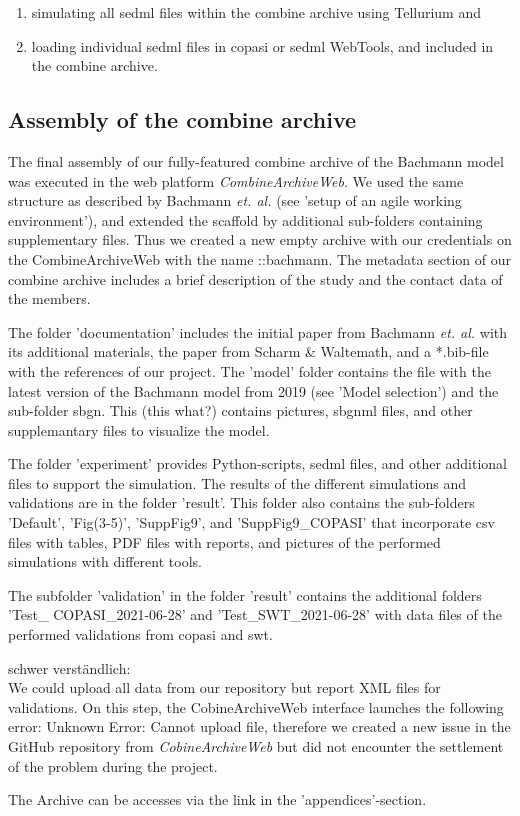 \begin{enumerate}
    \item simulating all \ac{sedml} files within the \ac{combine} archive using Tellurium and
    \item loading individual \ac{sedml} files in \ac{copasi} or \ac{sedml} WebTools, and included in the \ac{combine} archive.
\end{enumerate}

\subsection*{Assembly of the \acs{combine} archive}

The final assembly of our fully-featured \ac{combine} archive of the Bachmann model was executed in the web platform \textit{CombineArchiveWeb}. We used the same structure as described by Bachmann \textit{et. al.} (see 'setup of an agile working environment'), and extended the scaffold by additional sub-folders containing supplementary files. Thus we created a new empty archive with our credentials on the CombineArchiveWeb with the name \textsf{::bachmann}. The metadata section of our \ac{combine} archive includes a brief description of the study and the contact data of the members.

The folder 'documentation' includes the initial paper from Bachmann \textit{et. al.}  with its additional materials, the paper from Scharm \& Waltemath, and a \textsf{*.bib}-file with the references of our project. The 'model' folder contains the file with the latest version of the Bachmann model from 2019 (see 'Model selection') and the sub-folder \textsf{sbgn}. This (\textsf{this what?}) contains pictures, \ac{sbgnml} files, and other supplemantary files to visualize the model. 

The folder 'experiment' provides Python-scripts, \ac{sedml} files, and other additional files to support the simulation. The results of the different simulations and validations are in the folder 'result'. This folder also contains the sub-folders 'Default', 'Fig(3-5)', 'SuppFig9', and 'SuppFig9\_COPASI' that incorporate \ac{csv} files with tables, PDF files with reports, and pictures of the performed simulations with different tools.

The subfolder 'validation' in the folder 'result' contains the additional folders 'Test\_ COPASI\_2021-06-28' and 'Test\_SWT\_2021-06-28' with data files of the performed validations from \ac{copasi} and \ac{swt}.

\textsf{schwer verständlich:}\\
We could upload all data from our repository but report XML files for validations. On this step, the CobineArchiveWeb interface launches the following error: \textsf{Unknown Error: Cannot upload file}, therefore we created a new issue in the GitHub repository from \textit{CobineArchiveWeb} but did not encounter the settlement of the problem during the project.

The Archive can be accesses via the link in the 'appendices'-section.